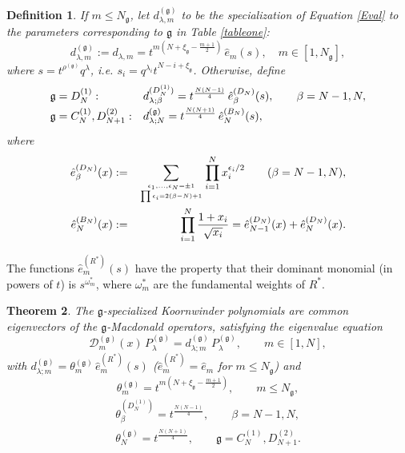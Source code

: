 \documentclass[12pt]{amsart}
\newtheorem{thm}{Theorem}[section]
\newtheorem{defn}[thm]{Definition}
\newcommand{\g}{{\mathfrak{g}}}
\numberwithin{equation}{section}
\begin{document}
\begin{defn}
If $m\leq N_\g$,
let $d_{\lambda,m}^{(\g)}$ to be the specialization of Equation \ref{Eval} to the parameters corresponding to $\g$ in Table \ref{tableone}:
\begin{equation}\label{newevaldef}
d_{\lambda,m }^{(\g)}:=d_{\lambda,m}=t^{m(N+\xi_\g-\frac{m+1}{2})}\, \hat e_m(s), \quad m\in[1,N_\g],
\end{equation}
%
%
where $s=t^{\rho^{(\g)}} q^\lambda$, i.e. $s_i=q^{\lambda_i} t^{N-i+\xi_\g}$.
Otherwise, define
\begin{equation}\label{evalex}
\renewcommand{\arraystretch}{1.5}
\begin{array}{ll}
\g=D_N^{(1)}:& d_{\lambda;\beta}^{(D_{N}^{(1)})}=t^{\frac{N(N-1)}{4}}\,{\hat e}_\beta^{(D_{N})}(s), \qquad  \beta=N-1,N ,\\
\g=C_N^{(1)}, D_{N+1}^{(2)}:&  d_{\lambda;N}^{(\g)}=t^{\frac{N(N+1)}{4}}\,{\hat e}_N^{(B_N)}(s),
%
\end{array}
\end{equation}
%
%
%
where
\begin{eqnarray}\label{restofehat}
{\hat e}_\beta^{(D_{N})}(x)&:=& \sum_{\epsilon_1,...,\epsilon_N=\pm1 \atop \prod \epsilon_i=2(\beta-N)+1} \prod_{i=1}^N x_i^{\epsilon_i/2}\qquad (\beta=N-1,N),\nonumber \\
{\hat e}_N^{(B_N)}(x)&:=& \prod_{i=1}^N \frac{1+x_i}{\sqrt{x_i}}={\hat e}_{N-1}^{(D_{N})}(x)+{\hat e}_N^{(D_{N})}(x).
\end{eqnarray}
\end{defn}
The functions $\hat e_m^{(R^*)}(s)$ have the property that their dominant monomial (in powers of $t$) is
$s^{\omega_m^*}$, where $\omega_m^*$ are the fundamental weights of $R^*$.
%
%
%


%

\begin{thm}\label{specmacG}
The $\g$-specialized Koornwinder polynomials are common eigenvectors of the $\g$-Macdonald operators, satisfying the eigenvalue equation
\begin{equation}\label{geneval}
 {\mathcal D}^{(\g)}_m(x)\, P_\lambda^{(\g)}= d_{\lambda;m}^{(\g)}\, P_\lambda^{(\g)} , \qquad m\in[1,N],
 \end{equation}
 with
%
 $d_{\lambda;m}^{(\g)}=\theta_m^{(\g)}\, \hat{e}_m^{(R^*)}(s)$
%
 ($\hat{e}_m^{(R^*)}= \hat{e}_m$ for $m\leq N_\g$)
 and 
\begin{equation}
 \theta_m^{(\g)}=t^{m(N+\xi_\g-\frac{m+1}{2})},\qquad m\leq N_\g \label{defthone} ,
 \end{equation}
 \begin{equation}\label{defthtwo}
 \begin{array}{c}
 \theta_\beta^{(D_{N}^{(1)})}=t^{\frac{N(N-1)}{4}}, \qquad \beta=N-1,N,\\
 \theta_N^{(\g)}=t^{\frac{N(N+1)}{4}}, \qquad \g=C_N^{(1)}, D_{N+1}^{(2)}.
%
\end{array}
\end{equation}
\end{thm}
\end{document}
